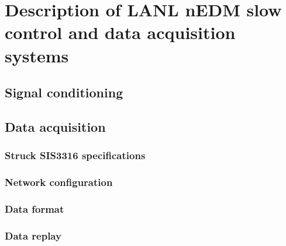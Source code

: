 
\chapter{Description of LANL nEDM slow control and data acquisition systems}



\section{Signal conditioning}



\section{Data acquisition}



\subsection{Struck SIS3316 specifications}



\subsection{Network configuration}



\subsection{Data format}



\subsection{Data replay}

